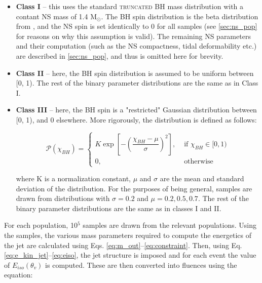     \begin{itemize}

        \item \textbf{Class I} -- this uses the standard \textsc{truncated} BH mass
            distribution with a contant NS mass of 1.4 M$_\odot$. The BH spin
            distribution is the beta distribution from \cite{abbott_2020B}, and the NS
            spin is set identically to 0 for all samples (see \ref{sec:ns_pop}
            for reasons on why this assumption is valid). The remaining NS parameters
            and their computation (such as the NS compactness, tidal deformability etc.)
            are described in \ref{sec:ns_pop}, and thus is omitted here for brevity.

        \item \textbf{Class II} -- here, the BH spin distribution is assumed to be
            uniform between [0, 1). The rest of the binary parameter distributions are
            the same as in Class I.

        \item \textbf{Class III} -- here, the BH spin is a "restricted" Gaussian
            distribution between [0, 1), and 0 elsewhere. More rigorously, the
            distribution is defined as follows:

            \begin{equation}
                \mathcal{P}(\chi_{BH}) =
                    \begin{cases}
                        K \exp \left[
                                - \left(
                                    \dfrac{\chi_{BH}-\mu}{\sigma}
                                  \right)^2
                            \right], &\text{ if } \chi_{BH} \in [0, 1) \\
                        0, &\text{ otherwise }
                    \end{cases}
            \end{equation}

            where K is a normalization constant, $\mu$ and $\sigma$ are the mean and
            standard deviation of the distribution.  For the purposes of being general,
            samples are drawn from distributions with $\sigma = 0.2$ and $\mu = 0.2,
            0.5, 0.7$.  The rest of the binary parameter distributions are the same as
            in classes I and II.

    \end{itemize}

    For each population, 10$^5$ samples are drawn from the relevant populations. Using
    the samples, the various mass parameters required to compute the energetics of the
    jet are calculated using Eqs. \ref{eq:m_out}--\ref{eq:constraint}. Then, using Eq.
    \ref{eq:e_kin_jet}--\ref{eq:eiso}, the jet structure is imposed and for each event
    the value of $E_{iso}(\theta_v)$ is computed. These are then converted into fluences
    using the equation:

